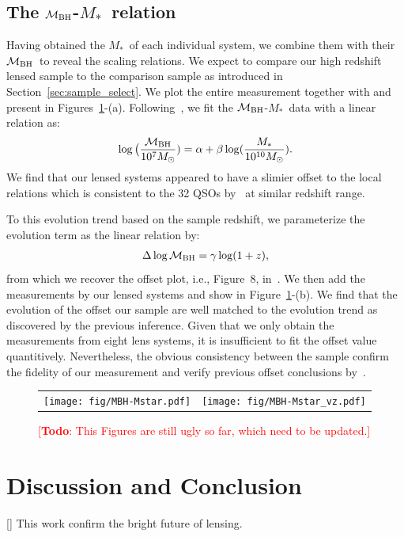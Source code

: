 \documentclass[fleqn,usenatbib]{mnras}
\newcommand{\mbh}{$\mathcal M_{\rm BH}$}
\newcommand{\mstar}{{$M_*$}}
\newcommand{\todo}[1]{\textcolor{red}{[{\bf Todo}: #1]}}
\begin{document}
\subsection{The \mbh-\mstar\ relation}\label{sec:relation}
Having obtained the \mstar\ of each individual system, we combine them with their \mbh\ to reveal the scaling relations. We expect to compare our high redshift lensed sample to the comparison sample as introduced in Section~\ref{sec:sample_select}. We plot the entire measurement together with and present in Figures~\ref{fig:scaling_relation}-(a). Following~\citet{Ding2020}, we fit the \mbh-\mstar\ data with a linear relation as:
\begin{eqnarray}
\label{eq:MMlocal}
\log \big( \frac{\mathcal M_{\rm BH}}{10^{7}M_{\odot}})= \alpha + \beta \log(\frac{M_*}{10^{10}M_{\odot}}).
\end {eqnarray}
We find that our lensed systems appeared to have a slimier offset to the local relations which is consistent to the 32 QSOs by~\citet{Ding2020} at similar redshift range.

To this evolution trend based on the sample redshift, we parameterize the evolution term as the linear relation by:
\begin{eqnarray}
\label{eq:offset}
\Delta \log \mathcal M_{\rm BH}= \gamma \log (1 + z),
\end{eqnarray} 
from which we recover the offset plot, i.e., Figure~8, in~\citet{Ding2020}. We then add the measurements by our lensed systems and show in Figure~\ref{fig:scaling_relation}-(b). We find that the evolution of the offset our sample are well matched to the evolution trend as discovered by the previous inference. Given that we only obtain the measurements from eight lens systems, it is insufficient to fit the offset value quantitively. Nevertheless, the obvious consistency between the sample confirm the fidelity of our measurement and verify previous offset conclusions by~\citet{Ding2020}.

\begin{figure}
\centering
\begin{tabular}{c c}
{\texttt{[image: fig/MBH-Mstar.pdf]}}&
{\texttt{[image: fig/MBH-Mstar\_vz.pdf]}}\\
\end{tabular}
\caption{\label{fig:scaling_relation} 
\todo{This Figures are still ugly so far, which need to be updated.}}
\end{figure} 

\section{Discussion and Conclusion}
[] This work confirm the bright future of lensing.
\end{document}
